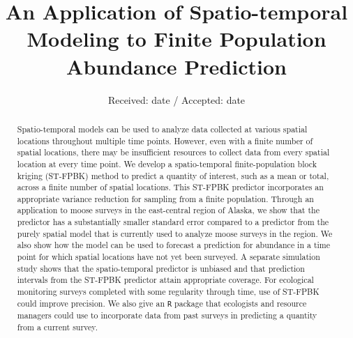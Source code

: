 \documentclass[smallextended]{svjour3}       %
\begin{document}
\title{An Application of Spatio-temporal Modeling to Finite Population
Abundance Prediction }



\author{  }


\institute{
    }

\date{Received: date / Accepted: date}


\maketitle

\begin{abstract}
Spatio-temporal models can be used to analyze data collected at various
spatial locations throughout multiple time points. However, even with a
finite number of spatial locations, there may be insufficient resources
to collect data from every spatial location at every time point. We
develop a spatio-temporal finite-population block kriging (ST-FPBK)
method to predict a quantity of interest, such as a mean or total,
across a finite number of spatial locations. This ST-FPBK predictor
incorporates an appropriate variance reduction for sampling from a
finite population. Through an application to moose surveys in the
east-central region of Alaska, we show that the predictor has a
substantially smaller standard error compared to a predictor from the
purely spatial model that is currently used to analyze moose surveys in
the region. We also show how the model can be used to forecast a
prediction for abundance in a time point for which spatial locations
have not yet been surveyed. A separate simulation study shows that the
spatio-temporal predictor is unbiased and that prediction intervals from
the ST-FPBK predictor attain appropriate coverage. For ecological
monitoring surveys completed with some regularity through time, use of
ST-FPBK could improve precision. We also give an \texttt{R} package that
ecologists and resource managers could use to incorporate data from past
surveys in predicting a quantity from a current survey.
\\


\end{abstract}


\def\spacingset#1{\renewcommand{\baselinestretch}%
{#1}\small\normalsize} \spacingset{1}
\end{document}
